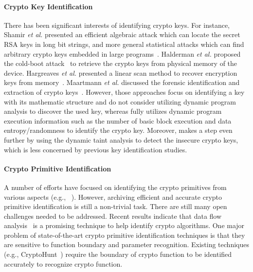\paragraph{Crypto Key Identification} There has been significant interests of identifying crypto keys. For instance, Shamir \emph{et al.} presented an efficient algebraic attack which can locate the secret \textsf{\small RSA} keys in long bit strings, and more general statistical attacks which can find arbitrary crypto keys embedded in large programs~\cite{shamir1999playing}. Halderman \emph{et al.} proposed the cold-boot attack~\cite{halderman2009lest} to retrieve the crypto keys from physical memory of the device. Hargreaves \emph{et al.} presented a linear scan method to recover encryption keys from memory~\cite{hargreaves2008recovery}. Maartmann \emph{et al.} discussed the forensic identification and extraction of crypto keys~\cite{maartmann2009persistence}. However, those approaches focus on identifying a key with its mathematic structure and do not consider utilizing dynamic program analysis to discover the used key, whereas \sysname fully utilizes dynamic program execution information such as the number of basic block execution and data entropy/randomness to identify the crypto key. Moreover, \sysname makes a step even further by using the dynamic taint analysis to detect the insecure crypto keys, which is less concerned by previous key identification studies.

\paragraph{Crypto Primitive Identification} A number of efforts have focused on identifying the crypto primitives from various aspects (e.g., ~\cite{grobert2011automated, matenaar2012cis, li2012cipherxray, calvet2012aligot, ruoxu2011detection}).
However, archiving efficient and accurate crypto primitive identification is still a non-trivial task. 
There are still many open challenges needed to be addressed. Recent results indicate that data flow analysis~\cite{lestringant2016assisted, lestringant2015automated} is a promising technique to help identify crypto algorithms. 
One major problem of state-of-the-art crypto primitive identification techniques is that they are sensitive to function boundary and parameter recognition. Existing techniques (e.g., CryptoHunt~\cite{xu2017cryptographic}) require the boundary of crypto function to be identified accurately to recognize crypto function. %


